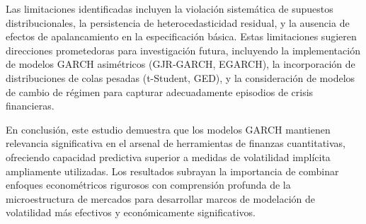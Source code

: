 Las limitaciones identificadas incluyen la violación sistemática de supuestos distribucionales, la persistencia de heterocedasticidad residual, y la ausencia de efectos de apalancamiento en la especificación básica. Estas limitaciones sugieren direcciones prometedoras para investigación futura, incluyendo la implementación de modelos GARCH asimétricos (GJR-GARCH, EGARCH), la incorporación de distribuciones de colas pesadas (t-Student, GED), y la consideración de modelos de cambio de régimen para capturar adecuadamente episodios de crisis financieras.

En conclusión, este estudio demuestra que los modelos GARCH mantienen relevancia significativa en el arsenal de herramientas de finanzas cuantitativas, ofreciendo capacidad predictiva superior a medidas de volatilidad implícita ampliamente utilizadas. Los resultados subrayan la importancia de combinar enfoques econométricos rigurosos con comprensión profunda de la microestructura de mercados para desarrollar marcos de modelación de volatilidad más efectivos y económicamente significativos.